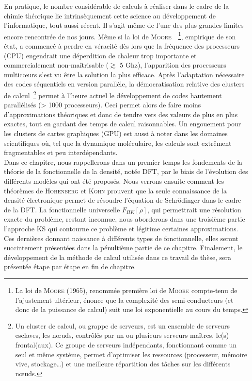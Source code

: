 En pratique, le nombre considérable de calculs à réaliser dans le cadre de la chimie théorique lie intrinsèquement cette science au développement de l'informatique, tout aussi récent. Il s'agit même de l'une des plus grandes limites encore rencontrée de nos jours. Même si la loi de \textsc{Moore}~\cite{moore1965electronics}~\footnote{La loi de \textsc{Moore} (1965), renommée première loi de \textsc{Moore} compte-tenu de l'ajustement ultérieur, énonce que la complexité des semi-conducteurs (et donc de la puissance de calcul) suit une loi exponentielle au cours du temps.}, empirique de son état, a commencé à perdre en véracité dès lors que la fréquence des processeurs (CPU) engendrait une déperdition de chaleur trop importante et commercialement non-maîtrisable ($\gtrsim$ 5 Ghz), l'apparition des processeurs multic\oe urs s'est vu être la solution la plus efficace. Après l'adaptation nécessaire des codes séquentiels en version parallèle, la démocratisation relative des clusters de calcul~\footnote{Un cluster de calcul, ou grappe de serveurs, est un ensemble de serveurs esclaves, les n\oe uds, contrôlés par un ou plusieurs serveurs maîtres, le(s) frontal(aux). Ce groupe de serveurs indépendants, fonctionnant comme un seul et même système, permet d'optimiser les ressources (processeur, mémoire vive, stockage\dots{}) et une meilleure répartition des tâches sur les différents n\oe uds.} permet à l'heure actuel le développement de codes hautement parallélisés (> 1000 processeurs). Ceci permet alors de faire moins d'approximations théoriques et donc de tendre vers des valeurs de plus en plus exactes, tout en gardant des temps de calcul raisonnables. Un engouement pour les clusters de cartes graphiques (GPU) est aussi à noter dans les domaines scientifiques où, tel que la dynamique moléculaire, les calculs sont extrêment fragmentables et peu interdépendants.\\

Dans ce chapitre, nous rappellerons dans un premier temps les fondements de la théorie de la fonctionnelle de la densité, notée DFT, par le biais de l'évolution des différents modèles qui ont été proposés. Nous verrons ensuite comment les théorèmes de \textsc{Hohenberg} et \textsc{Kohn} prouvent que la seule connaissance de la densité électronique permet de résoudre l'équation de Schr\"{o}dinger dans le cadre de la DFT. La fonctionnelle universelle $F_{HK}[\rho]$, qui permettrait une résolution exacte du problème, restant inconnue, nous aborderons dans une troisième partie l'approche KS qui contourne ce problème et légitime certaines approximations. Ces dernières donnant naissance à différents types de fonctionnelle, elles seront succintement présentées dans la pénultième partie de ce chapitre. Finalement, le développement de la méthode de calcul utilisée dans ce travail de thèse, sera présentée étape par étape en fin de chapitre. 

